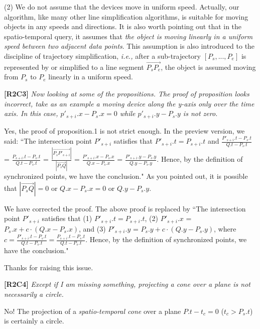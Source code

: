 \documentclass{letter}
\newcommand{\ie}{\emph{i.e.,}\xspace}
\begin{document}
(2) We do not assume that the devices move in uniform speed. Actually, our algorithm, like many other line simplification algorithms, is suitable for moving objects in any speeds and directions. It is also worth pointing out that in the spatio-temporal query, it assumes that \textit{the object is moving linearly in a uniform speed between two adjacent data points}. This assumption is also introduced to the discipline of trajectory simplification, \ie after a sub-trajectory $[P_s, ..., P_e]$ is represented by or simplified to a line segment $\overrightarrow{P_sP_e}$, the object is assumed moving from $P_s$ to $P_e$ linearly in a uniform speed.  

\textbf{[R2C3]} \emph{Now looking at some of the propositions.
The proof of proposition looks incorrect, take as an example a moving device along the y-axis only over the time axis. In this case, $p'_{s+i}.x - P_s.x = 0$ while $p'_{s+i}.y - P_s.y$ is not zero.
}

Yes, the proof of proposition.1 is not strict enough. In the preview version, we said:
``The intersection point $P'_{s+i}$ satisfies that $P'_{s+i}.t = P_{s+i}.t$ and
$\frac{P'_{s+i}.t - P_{s}.t}{Q.t - P_{s}.t}$ = $\frac{P_{s+i}.t - P_{s}.t}{Q.t - P_{s}.t}$  =
$\frac{|\overrightarrow{P_sP'_{s+i}}|}{|\overrightarrow{P_sQ}|}$ =
$\frac{P'_{s+i}.x - P_{s}.x}{Q.x - P_{s}.x}$ = 
$\frac{P'_{s+i}.y - P_{s}.y}{Q.y - P_{s}.y}$.
Hence, by the definition of synchronized points, we have the conclusion."
As you pointed out, it is possible that $|\overrightarrow{P_sQ}|=0$ or $Q.x - P_{s}.x=0$ or $Q.y - P_{s}.y$.

We have corrected the proof. The above proof is replaced by
``The intersection point $P'_{s+i}$ satisfies that 
(1) $P'_{s+i}.t = P_{s+i}.t$, 
(2) $P'_{s+i}.x$ = $P_s.x +  c\cdot(Q.x - P_s.x)$, and
(3) $P'_{s+i}.y$ = $P_s.y +  c\cdot(Q.y - P_s.y)$, 
where $c= \frac{P'_{s+i}.t - P_{s}.t}{Q.t - P_{s}.t}= \frac{P_{s+i}.t-P_s.t}{Q.t-P_s.t}$.
Hence, by the definition of synchronized points, we have the conclusion."

Thanks for raising this issue.


\textbf{[R2C4]} \emph{Except if I am missing something, projecting a cone over a plane is not necessarily a circle.}

No! The projection of a \emph{spatio-temporal cone} over a plane $P.t- t_c = 0$ ($t_c > P_s.t$) is certainly a circle. 
\end{document}
